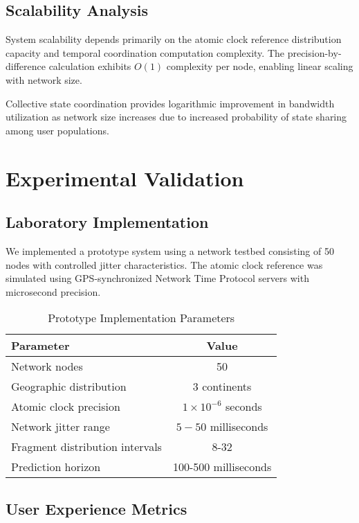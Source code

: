 \documentclass[12pt,a4paper]{article}
\begin{document}
\subsection{Scalability Analysis}

System scalability depends primarily on the atomic clock reference distribution capacity and temporal coordination computation complexity. The precision-by-difference calculation exhibits $O(1)$ complexity per node, enabling linear scaling with network size.

Collective state coordination provides logarithmic improvement in bandwidth utilization as network size increases due to increased probability of state sharing among user populations.

\section{Experimental Validation}

\subsection{Laboratory Implementation}

We implemented a prototype system using a network testbed consisting of 50 nodes with controlled jitter characteristics. The atomic clock reference was simulated using GPS-synchronized Network Time Protocol servers with microsecond precision.

\begin{table}[htbp]
\centering
\caption{Prototype Implementation Parameters}
\begin{tabular}{@{}lc@{}}
\toprule
\textbf{Parameter} & \textbf{Value} \\
\midrule
Network nodes & 50 \\
Geographic distribution & 3 continents \\
Atomic clock precision & $1 \times 10^{-6}$ seconds \\
Network jitter range & $5-50$ milliseconds \\
Fragment distribution intervals & 8-32 \\
Prediction horizon & 100-500 milliseconds \\
\bottomrule
\end{tabular}
\end{table}

\subsection{User Experience Metrics}
\end{document}
